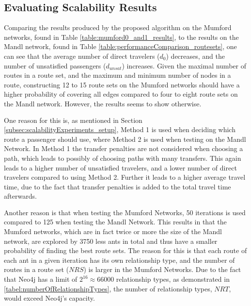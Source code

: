 \subsection{Evaluating Scalability Results}

Comparing the results produced by the proposed algorithm on the Mumford networks, found in Table \vref{table:mumford0_and1_results}, to the results on the Mandl network, found in Table \vref{table:performanceComparison_routesets}, one can see that the average number of direct travelers ($d_0$) decreases, and the number of unsatisfied passengers ($d_{unsat}$) increases. Given the maximal number of routes in a route set, and the maximum and minimum number of nodes in a route, constructing 12 to 15 route sets on the Mumford networks should have a higher probability of covering all edges compared to four to eight route sets on the Mandl network. However, the results seems to show otherwise.

One reason for this is, as mentioned in Section \vref{subsec:scalabilityExperiments_setup}, Method 1 is used when deciding which route a passenger should use, where Method 2 is used when testing on the Mandl Network. In Method 1 the transfer penalties are not considered when choosing a path, which leads to possibly of choosing paths with many transfers. This again leads to a higher number of unsatisfied travelers, and a lower number of direct travelers compared to using Method 2. Further it leads to a higher average travel time, due to the fact that transfer penalties is added to the total travel time afterwards. 

Another reason is that when testing the Mumford Networks, 50 iterations is used compared to 125 when testing the Mandl Network. This results in that the Mumford networks, which are in fact twice or more the size of the Mandl network, are explored by 3750 less ants in total and thus have a smaller probability of finding the best route sets. The reason for this is that each route of each ant in a given iteration has its own relationship type, and the number of routes in a route set ($NRS$) is larger in the Mumford Networks. Due to the fact that Neo4j has a limit of $2^{16} \approx 66 000$ relationship types, as demonstrated in \vref{tabel:numberOfRelationshipTypes}, the number of relationship types, $NRT$, would exceed Neo4j's capacity. 

